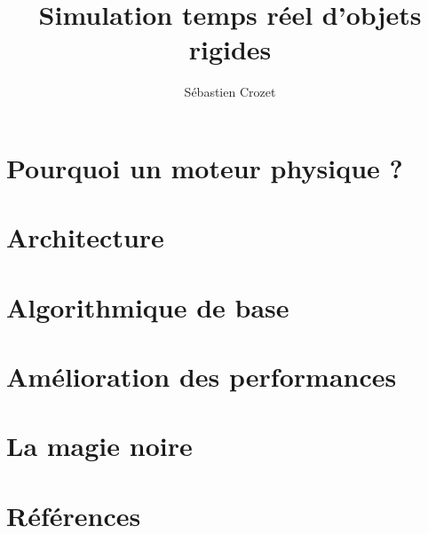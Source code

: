 \documentclass{beamer}
\title{Simulation temps réel d'objets rigides}
\author{Sébastien Crozet}
\begin{document}
\maketitle
\tableofcontents

\section{Pourquoi un moteur physique ?}

\section{Architecture}

\section{Algorithmique de base}

\section{Amélioration des performances}

\section{La magie noire}

\section{Références}
\end{document}

